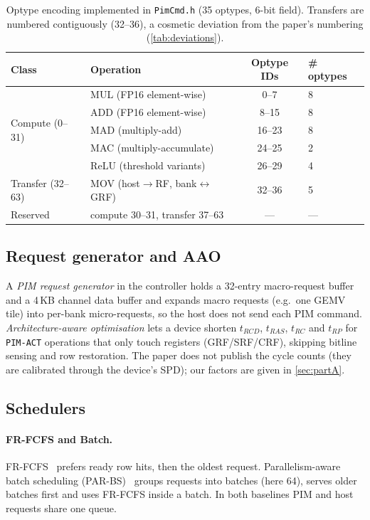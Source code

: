 \documentclass[conference]{IEEEtran}
\newcommand{\cmd}[1]{\texttt{\footnotesize #1}}
\newcommand{\pimact}{\cmd{PIM-ACT}\xspace}
\begin{document}
\begin{table}[!tbp]
\centering
\caption{Optype encoding implemented in \cmd{PimCmd.h} (35 optypes, 6-bit field). Transfers are numbered contiguously (32--36), a cosmetic deviation from the paper's numbering (\cref{tab:deviations}).}\label{tab:optype}
\scriptsize
\setlength{\tabcolsep}{3pt}
\begin{tabular}{@{}llcl@{}}
\toprule
\textbf{Class} & \textbf{Operation} & \textbf{Optype IDs} & \textbf{\# optypes}\\
\midrule
\multirow{5}{*}{Compute (0--31)} & MUL (FP16 element-wise) & 0--7 & 8\\
 & ADD (FP16 element-wise) & 8--15 & 8\\
 & MAD (multiply-add) & 16--23 & 8\\
 & MAC (multiply-accumulate) & 24--25 & 2\\
 & ReLU (threshold variants) & 26--29 & 4\\
\midrule
Transfer (32--63) & MOV (host$\to$RF, bank$\leftrightarrow$GRF) & 32--36 & 5\\
\midrule
Reserved & compute 30--31, transfer 37--63 & --- & ---\\
\bottomrule
\end{tabular}
\end{table}

\subsection{Request generator and AAO}
A \emph{PIM request generator} in the controller holds a 32-entry macro-request buffer and a 4\,KB channel data buffer and expands macro requests (e.g.\ one GEMV tile) into per-bank micro-requests, so the host does not send each PIM command. \emph{Architecture-aware optimisation} lets a device shorten $t_{RCD}$, $t_{RAS}$, $t_{RC}$ and $t_{RP}$ for \pimact operations that only touch registers (GRF/SRF/CRF), skipping bitline sensing and row restoration. The paper does not publish the cycle counts (they are calibrated through the device's SPD); our factors are given in \cref{sec:partA}.

\subsection{Schedulers}
\paragraph{FR-FCFS and Batch.} FR-FCFS~\cite{rixner} prefers ready row hits, then the oldest request. Parallelism-aware batch scheduling (PAR-BS)~\cite{parbs} groups requests into batches (here 64), serves older batches first and uses FR-FCFS inside a batch. In both baselines PIM and host requests share one queue.
\end{document}
